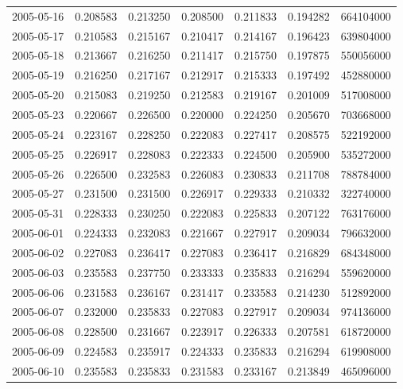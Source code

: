 \begin{tabular}{lrrrrrr}
2005-05-16 &    0.208583 &    0.213250 &    0.208500 &    0.211833 &    0.194282 &   664104000 \\
2005-05-17 &    0.210583 &    0.215167 &    0.210417 &    0.214167 &    0.196423 &   639804000 \\
2005-05-18 &    0.213667 &    0.216250 &    0.211417 &    0.215750 &    0.197875 &   550056000 \\
2005-05-19 &    0.216250 &    0.217167 &    0.212917 &    0.215333 &    0.197492 &   452880000 \\
2005-05-20 &    0.215083 &    0.219250 &    0.212583 &    0.219167 &    0.201009 &   517008000 \\
2005-05-23 &    0.220667 &    0.226500 &    0.220000 &    0.224250 &    0.205670 &   703668000 \\
2005-05-24 &    0.223167 &    0.228250 &    0.222083 &    0.227417 &    0.208575 &   522192000 \\
2005-05-25 &    0.226917 &    0.228083 &    0.222333 &    0.224500 &    0.205900 &   535272000 \\
2005-05-26 &    0.226500 &    0.232583 &    0.226083 &    0.230833 &    0.211708 &   788784000 \\
2005-05-27 &    0.231500 &    0.231500 &    0.226917 &    0.229333 &    0.210332 &   322740000 \\
2005-05-31 &    0.228333 &    0.230250 &    0.222083 &    0.225833 &    0.207122 &   763176000 \\
2005-06-01 &    0.224333 &    0.232083 &    0.221667 &    0.227917 &    0.209034 &   796632000 \\
2005-06-02 &    0.227083 &    0.236417 &    0.227083 &    0.236417 &    0.216829 &   684348000 \\
2005-06-03 &    0.235583 &    0.237750 &    0.233333 &    0.235833 &    0.216294 &   559620000 \\
2005-06-06 &    0.231583 &    0.236167 &    0.231417 &    0.233583 &    0.214230 &   512892000 \\
2005-06-07 &    0.232000 &    0.235833 &    0.227083 &    0.227917 &    0.209034 &   974136000 \\
2005-06-08 &    0.228500 &    0.231667 &    0.223917 &    0.226333 &    0.207581 &   618720000 \\
2005-06-09 &    0.224583 &    0.235917 &    0.224333 &    0.235833 &    0.216294 &   619908000 \\
2005-06-10 &    0.235583 &    0.235833 &    0.231583 &    0.233167 &    0.213849 &   465096000 \\

\end{tabular}

